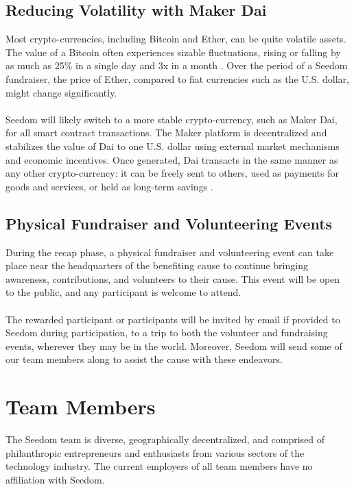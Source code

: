 \documentclass[11pt]{article}
\begin{document}
\subsection{Reducing Volatility with Maker Dai}

Most crypto-currencies, including Bitcoin and Ether, can be quite volatile assets. The value of a Bitcoin often experiences sizable fluctuations, rising or falling by as much as 25\% in a single day and 3x in a month \cite{10}. Over the period of a Seedom fundraiser, the price of Ether, compared to fiat currencies such as the U.S. dollar, might change significantly.\\\\
Seedom will likely switch to a more stable crypto-currency, such as Maker Dai, for all smart contract transactions. The Maker platform is decentralized and stabilizes the value of Dai to one U.S. dollar using external market mechanisms and economic incentives. Once generated, Dai transacts in the same manner as any other crypto-currency: it can be freely sent to others, used as payments for goods and services, or held as long-term savings \cite{9}. 

\subsection{Physical Fundraiser and Volunteering Events}

During the recap phase, a physical fundraiser and volunteering event can take place near the headquarters of the benefiting cause to continue bringing awareness, contributions, and volunteers to their cause. This event will be open to the public, and any participant is welcome to attend.\\\\
The rewarded participant or participants will be invited by email if provided to Seedom during participation, to a trip to both the volunteer and fundraising events, wherever they may be in the world. Moreover, Seedom will send some of our team members along to assist the cause with these endeavors.

\section{Team Members}

The Seedom team is diverse, geographically decentralized, and comprised of philanthropic entrepreneurs and enthusiasts from various sectors of the technology industry. The current employers of all team members have no affiliation with Seedom.
\end{document}
